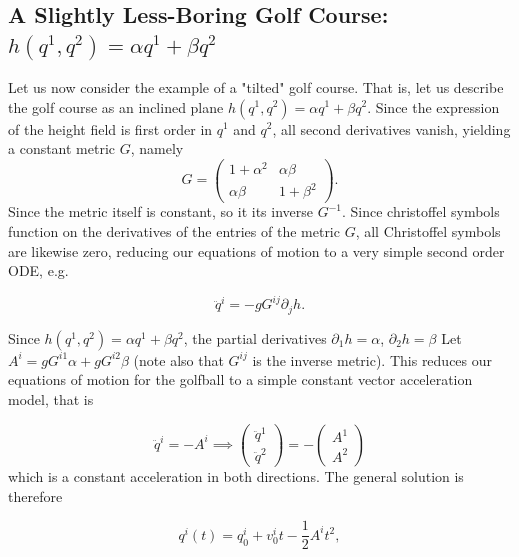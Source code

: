 \subsection{A Slightly Less-Boring Golf Course: $h(q^1,q^2)=\alpha q^1 + \beta q^2$}

Let us now consider the example of a "tilted" golf course. That is, let us describe the golf course as an inclined plane $h(q^1, q^2) = \alpha q^1 + \beta q^2$. Since the expression of the height field is first order in $q^1$ and $q^2$, all second derivatives vanish, yielding a constant metric $G$, namely
\begin{equation}
	G = \begin{pmatrix}
1 + \alpha^2 & \alpha\beta \\
\alpha\beta & 1 + \beta^2
\end{pmatrix}.
\end{equation}
Since the metric itself is constant, so it its inverse $G^{-1}$. Since christoffel symbols function on the derivatives of the entries of the metric $G$, all Christoffel symbols are likewise zero, reducing our equations of motion to a very simple second order ODE, e.g.

\begin{equation}
	\ddot{q}^i = -g G^{ij} \partial_j h.
\end{equation}

Since $h(q^1,q^2)=\alpha q^1 + \beta q^2$, the partial derivatives $\partial_1 h = \alpha$, $\partial_2 h = \beta$ Let $A^i = g G^{i1} \alpha + g G^{i2} \beta$ (note also that $G^{ij}$ is the inverse metric). This reduces our equations of motion for the golfball to a simple constant vector acceleration model, that is

\begin{equation}
	\ddot{q}^i = -A^i \implies \begin{pmatrix}
		\ddot q^1 \\ \ddot q^2
	\end{pmatrix} = -\begin{pmatrix}
		A^1 \\ A^2
	\end{pmatrix}
\end{equation}
which is a constant acceleration in both directions. The general solution is therefore

\begin{equation}
	q^i(t) = q^i_0 + v^i_0 t - \frac{1}{2} A^i t^2,
\end{equation}

